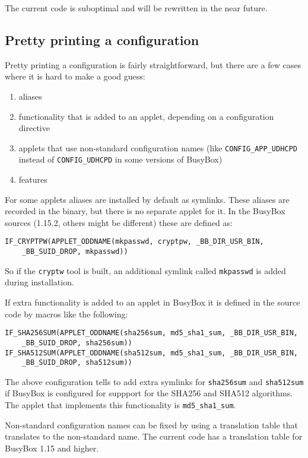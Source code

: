 \documentclass[10pt]{article}
\begin{document}
The current code is suboptimal and will be rewritten in the near future.

\subsection{Pretty printing a configuration}

Pretty printing a configuration is fairly straightforward, but there are a few
cases where it is hard to make a good guess:

\begin{enumerate}
\item aliases
\item functionality that is added to an applet, depending on a configuration
directive
\item applets that use non-standard configuration names (like
\texttt{CONFIG\_APP\_UDHCPD} instead of \texttt{CONFIG\_UDHCPD} in some
versions of BusyBox)
\item features
\end{enumerate}

For some applets aliases are installed by default as symlinks. These aliases
are recorded in the binary, but there is no separate applet for it. In the
BusyBox sources (1.15.2, others might be different) these are defined as:

\begin{verbatim}
IF_CRYPTPW(APPLET_ODDNAME(mkpasswd, cryptpw, _BB_DIR_USR_BIN,
    _BB_SUID_DROP, mkpasswd))
\end{verbatim}

So if the \texttt{cryptw} tool is built, an additional symlink called
\texttt{mkpasswd} is added during installation.

If extra functionality is added to an applet in BusyBox it is defined in the
source code by macros like the following:

\begin{verbatim}
IF_SHA256SUM(APPLET_ODDNAME(sha256sum, md5_sha1_sum, _BB_DIR_USR_BIN,
    _BB_SUID_DROP, sha256sum))
IF_SHA512SUM(APPLET_ODDNAME(sha512sum, md5_sha1_sum, _BB_DIR_USR_BIN,
    _BB_SUID_DROP, sha512sum))
\end{verbatim}

The above configuration tells to add extra symlinks for \texttt{sha256sum} and
\texttt{sha512sum} if BusyBox is configured for suppport for the SHA256 and
SHA512 algorithms. The applet that implements this functionality is
\texttt{md5\_sha1\_sum}.

Non-standard configuration names can be fixed by using a translation table that
translates to the non-standard name. The current code has a translation table
for BusyBox 1.15 and higher.
\end{document}
